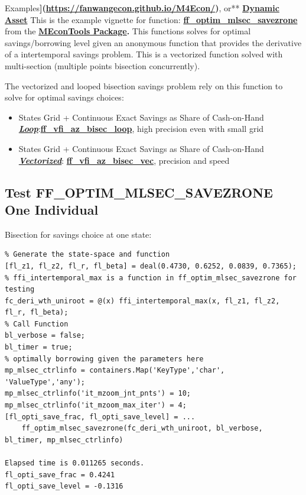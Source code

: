 \documentclass[
]{book}
\begin{document}
Examples\textbf{{]}(\url{https://fanwangecon.github.io/M4Econ/})}, or** \href{https://fanwangecon.github.io/CodeDynaAsset/}{\textbf{Dynamic
Asset}}
This is the example vignette for function:
\href{https://github.com/FanWangEcon//MEconTools/blob/master/MEconTools/optim/ff_optim_mlsec_savezrone.m}{\textbf{ff\_optim\_mlsec\_savezrone}}
from the \href{https://fanwangecon.github.io/MEconTools/}{\textbf{MEconTools
Package}}\textbf{.} This
functions solves for optimal savings/borrowing level given an anonymous
function that provides the derivative of a intertemporal savings
problem. This is a vectorized function solved with multi-section
(multiple points bisection concurrently).

The vectorized and looped bisection savings problem rely on this
function to solve for optimal savings choices:

\begin{itemize}
\item
  States Grid + Continuous Exact Savings as Share of Cash-on-Hand
  \underline{\textbf{\emph{Loop}}}:\href{https://github.com/FanWangEcon/MEconTools/blob/master/MEconTools/vfi/ff_vfi_az_bisec_loop.m}{\textbf{ff\_vfi\_az\_bisec\_loop}},
  high precision even with small grid
\item
  States Grid + Continuous Exact Savings as Share of Cash-on-Hand
  \underline{\textbf{\emph{Vectorized}}}:
  \href{https://github.com/FanWangEcon/MEconTools/blob/master/MEconTools/vfi/ff_vfi_az_bisec_vec.m}{\textbf{ff\_vfi\_az\_bisec\_vec}},
  precision and speed
\end{itemize}

\hypertarget{test-ff_optim_mlsec_savezrone-one-individual}{%
\subsection{Test FF\_OPTIM\_MLSEC\_SAVEZRONE One Individual}\label{test-ff_optim_mlsec_savezrone-one-individual}}

Bisection for savings choice at one state:

\begin{verbatim}
% Generate the state-space and function
[fl_z1, fl_z2, fl_r, fl_beta] = deal(0.4730, 0.6252, 0.0839, 0.7365);
% ffi_intertemporal_max is a function in ff_optim_mlsec_savezrone for testing
fc_deri_wth_uniroot = @(x) ffi_intertemporal_max(x, fl_z1, fl_z2, fl_r, fl_beta);
% Call Function
bl_verbose = false;
bl_timer = true;
% optimally borrowing given the parameters here
mp_mlsec_ctrlinfo = containers.Map('KeyType','char', 'ValueType','any');
mp_mlsec_ctrlinfo('it_mzoom_jnt_pnts') = 10;
mp_mlsec_ctrlinfo('it_mzoom_max_iter') = 4;
[fl_opti_save_frac, fl_opti_save_level] = ...
    ff_optim_mlsec_savezrone(fc_deri_wth_uniroot, bl_verbose, bl_timer, mp_mlsec_ctrlinfo)

Elapsed time is 0.011265 seconds.
fl_opti_save_frac = 0.4241
fl_opti_save_level = -0.1316
\end{verbatim}
\end{document}
